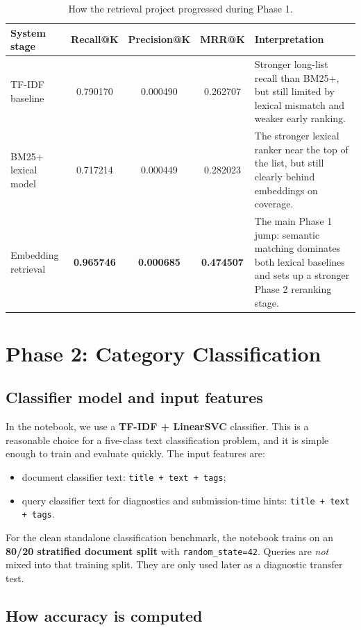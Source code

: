 \documentclass[11pt,a4paper]{article}
\begin{document}
\begin{table}[H]
\centering
\small
\begin{tabularx}{\linewidth}{l c c c Y}
\toprule
System stage & Recall@K & Precision@K & MRR@K & Interpretation \\
\midrule
TF-IDF baseline & 0.790170 & 0.000490 & 0.262707 & Stronger long-list recall than BM25+, but still limited by lexical mismatch and weaker early ranking. \\
BM25+ lexical model & 0.717214 & 0.000449 & 0.282023 & The stronger lexical ranker near the top of the list, but still clearly behind embeddings on coverage. \\
Embedding retrieval & \textbf{0.965746} & \textbf{0.000685} & \textbf{0.474507} & The main Phase 1 jump: semantic matching dominates both lexical baselines and sets up a stronger Phase 2 reranking stage. \\
\bottomrule
\end{tabularx}
\caption{How the retrieval project progressed during Phase 1.}
\label{tab:phase1roadmap}
\end{table}

\section{Phase 2: Category Classification}

\subsection{Classifier model and input features}

In the notebook, we use a \textbf{TF-IDF + LinearSVC} classifier. This is a reasonable choice for a five-class text classification problem, and it is simple enough to train and evaluate quickly. The input features are:
\begin{itemize}
    \item document classifier text: \texttt{title + text + tags};
    \item query classifier text for diagnostics and submission-time hints: \texttt{title + text + tags}.
\end{itemize}

For the clean standalone classification benchmark, the notebook trains on an \textbf{80/20 stratified document split} with \texttt{random\_state=42}. Queries are \emph{not} mixed into that training split. They are only used later as a diagnostic transfer test.

\subsection{How accuracy is computed}
\end{document}
